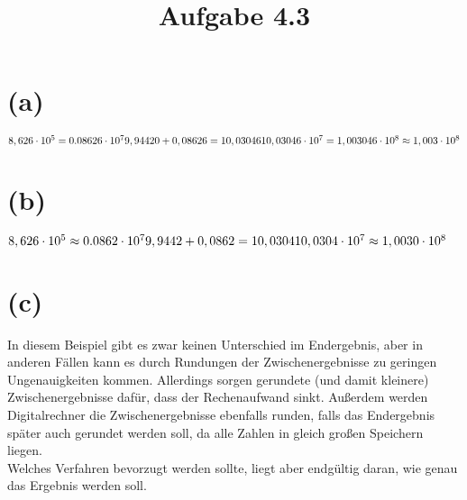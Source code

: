 \documentclass[a4paper,11pt]{article}
\title{Aufgabe 4.3}
\begin{document}
\maketitle
\section*{(a)}
$8,626 \cdot 10^5 = 0.08626 \cdot 10^7 \\
\\
9,94420 + 0,08626 = 10,03046\\
\\
10,03046 \cdot 10^7 = 1,003046 \cdot 10^8 \approx 1,003 \cdot 10^8$

\section*{(b)}
$8,626 \cdot 10^5 \approx 0.0862 \cdot 10^7 \\
\\
9,9442 + 0,0862 = 10,0304\\
\\
10,0304 \cdot 10^7 \approx 1,0030 \cdot 10^8$

\section*{(c)}
In diesem Beispiel gibt es zwar keinen Unterschied im Endergebnis, aber in anderen F\"allen kann es durch Rundungen der Zwischenergebnisse zu geringen Ungenauigkeiten kommen. Allerdings sorgen gerundete (und damit kleinere) Zwischenergebnisse daf\"ur, dass der Rechenaufwand sinkt. Au\ss erdem werden Digitalrechner die Zwischenergebnisse ebenfalls runden, falls das Endergebnis sp\"ater auch gerundet werden soll, da alle Zahlen in gleich gro\ss en Speichern liegen.\\ 
Welches Verfahren bevorzugt werden sollte, liegt aber endg\"ultig daran, wie genau das Ergebnis werden soll.
\end{document}
